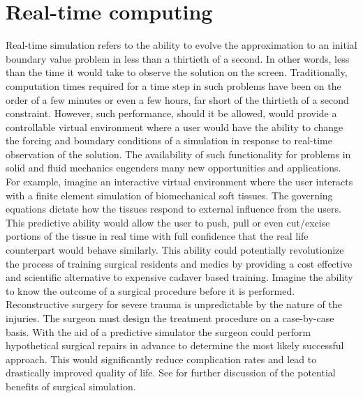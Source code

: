 \section*{Real-time computing}
Real-time simulation refers to the ability to evolve the approximation to an initial boundary value problem in less than a thirtieth of a second. In other words, less than the time it would take to observe the solution on the screen. Traditionally, computation times required for a time step in such problems have been on the order of a few minutes or even a few hours, far short of the thirtieth of a second constraint. However, such performance, should it be allowed, would provide a controllable virtual environment where a user would have the ability to change the forcing and boundary conditions of a simulation in response to real-time observation of the solution. The availability of such functionality for problems in solid and fluid mechanics engenders many new opportunities and applications. For example, imagine an interactive virtual environment where the user interacts with a finite element simulation of biomechanical soft tissues. The governing equations dictate how the tissues respond to external influence from the users. This predictive ability would allow the user to push, pull or even cut/excise portions of the tissue in real time with full confidence that the real life counterpart would behave similarly. This ability could potentially revolutionize the process of training surgical residents and medics by providing a cost effective and scientific alternative to expensive cadaver based training. Imagine the ability to know the outcome of a surgical procedure before it is performed. Reconstructive surgery for severe trauma is unpredictable by the nature of the injuries. The surgeon must design the treatment procedure on a case-by-case basis. With the aid of a predictive simulator the surgeon could perform hypothetical surgical repairs in advance to determine the most likely successful approach. This would significantly reduce complication rates and lead to drastically improved quality of life. See \cite{Sifakis09} for further discussion of the potential benefits of surgical simulation.

